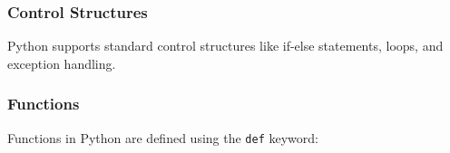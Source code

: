 \hypertarget{control-structures}{%
\subsubsection{Control Structures}\label{control-structures}}

Python supports standard control structures like if-else statements,
loops, and exception handling.

\begin{Shaded}
\begin{Highlighting}[]
\OperatorTok{=} 
\OperatorTok{\textgreater{}} \NormalTok{:}
    \NormalTok{(}\NormalTok{)}
\NormalTok{:}
    \NormalTok{(}\NormalTok{)}

 \NormalTok{(}\NormalTok{):}

\OperatorTok{=} 
\OperatorTok{\textless{}} \NormalTok{:}
\OperatorTok{+=} 

\NormalTok{:}
\OperatorTok{=}  \OperatorTok{/} 
 \NormalTok{:}
    \NormalTok{(}\NormalTok{)}
\end{Highlighting}
\end{Shaded}

\hypertarget{functions}{%
\subsubsection{Functions}\label{functions}}

Functions in Python are defined using the \texttt{def} keyword:

\begin{Shaded}
\begin{Highlighting}[]
    \OperatorTok{==}  \OperatorTok{==} \NormalTok{:}
         
    \NormalTok{:}
        \OperatorTok{*}\OperatorTok{{-}} \NormalTok{)}

\NormalTok{))  }
\end{Highlighting}
\end{Shaded}

